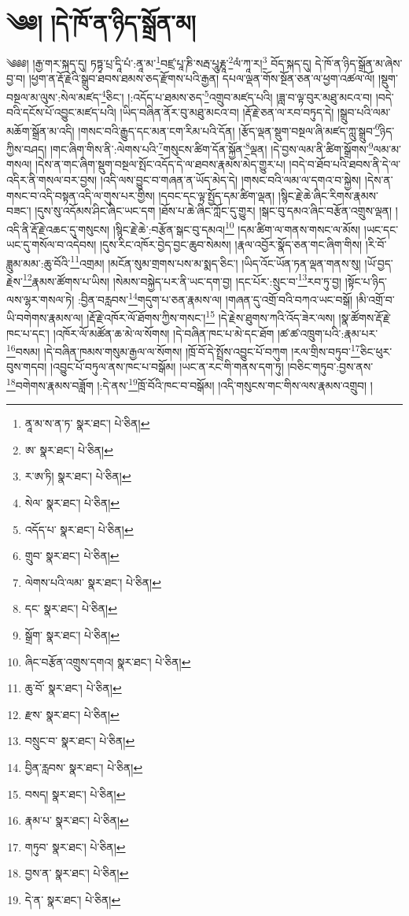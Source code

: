 \setcounter{footnote}{0} 
\chapter{༄༅། །དེ་ཁོ་ན་ཉིད་སྒྲོན་མ།}༄༅༅། །རྒྱ་གར་སྐད་དུ། ཏཏྟྭ་པྲ་དཱི་པཾ་:ནཱ་མ་\footnote{ནཱ་མ་ས་ན་ཏ་  སྣར་ཐང་།  པེ་ཅིན། }བཛྲ་པཱ་ཎི་སརྦ་པཱུརྞཱ་\footnote{ཨ་  སྣར་ཐང་།  པེ་ཅིན། }ལཾ་ཀཱ་ར།\footnote{ར་ཨ་ཏི།  སྣར་ཐང་།  པེ་ཅིན། } བོད་སྐད་དུ། དེ་ཁོ་ན་ཉིད་སྒྲོན་མ་ཞེས་བྱ་བ། །ཕྱག་ན་རྡོ་རྗེའི་སྒྲུབ་ཐབས་ཐམས་ཅད་རྫོགས་པའི་རྒྱན། དཔལ་ལྡན་གོས་སྔོན་ཅན་ལ་ཕྱག་འཚལ་ལོ། །སྡུག་བསྔལ་མ་ལུས་:སེལ་མཛད་\footnote{སེལ་  སྣར་ཐང་།  པེ་ཅིན། }ཅིང་། །:འདོད་པ་ཐམས་ཅད་\footnote{འདོད་པ་  སྣར་ཐང་།  པེ་ཅིན། }འགྲུབ་མཛད་པའི། །ཟླ་བ་ལྟ་བུར་མཐུ་མངའ་བ། །བདེ་བའི་དངོས་པོ་འབྱུང་མཛད་པའི། །ཡིད་བཞིན་ནོར་བུ་མཐུ་མངའ་བ། །རྡོ་རྗེ་ཅན་ལ་རབ་བཏུད་དེ། །སྒྲུབ་པའི་ལམ་མཆོག་སྒྲོན་མ་འདི། །གསང་བའི་རྒྱུད་དང་མན་ངག་རིམ་པའི་དོན། །རྩོད་ལྡན་སྡུག་བསྔལ་ཞི་མཛད་ཀླུ་སྒྲུབ་\footnote{གྲུབ་  སྣར་ཐང་།  པེ་ཅིན། }ཉིད་ཀྱིས་བཤད། །གང་ཞིག་གིས་ནི་:ལེགས་པའི་\footnote{ལེགས་པའི་ལམ་  སྣར་ཐང་།  པེ་ཅིན། }གསུངས་ཚིག་དོན་སྐྱོན་\footnote{དང་  སྣར་ཐང་།  པེ་ཅིན། }ལྡན། །དེ་བྱས་ལམ་ནི་ཚིག་སྒྲོགས་\footnote{སྒྲོག་  སྣར་ཐང་།  པེ་ཅིན། }ལམ་མ་གསལ། །དེས་ན་གང་ཞིག་སྡུག་བསྔལ་སྤོང་འདོད་དེ་ལ་ཐབས་རྣམས་མེད་གྱུར་པ། །བདེ་བ་ཐོབ་པའི་ཐབས་ནི་དེ་ལ་འདིར་ནི་གསལ་བར་བྱས། །འདི་ལས་བྱུང་བ་གཞན་ན་ཡོད་མེད་དེ། །གསང་བའི་ལམ་ལ་དགའ་བ་སྐྱེས། །དེས་ན་གསང་བ་འདི་བསྟན་འདི་ལ་གུས་པར་གྱིས། །དབང་དང་ལྟ་སྤྱོད་དམ་ཚིག་ལྡན། །སྙིང་རྗེ་ཆེ་ཞིང་རིགས་རྣམས་བཟང་། །དུས་སུ་འདོམས་ཤིང་ཞིང་ཡང་དག །ཐོས་པ་ཆེ་ཞིང་ཀློང་དུ་གྱུར། །སྒང་བུ་དམའ་ཞིང་བརྩོན་འགྲུས་ལྡན། །འདི་ནི་རྡོ་རྗེ་འཆང་དུ་གསུངས། །སྙིང་རྗེ་ཆེ་:བརྩོན་སྒང་བུ་དམའ།\footnote{ཞིང་བརྩོན་འགྲུས་དགའ།  སྣར་ཐང་།  པེ་ཅིན། } །དམ་ཚིག་ལ་གནས་གསང་ལ་མོས། །ཡང་དང་ཡང་དུ་གསོལ་བ་འདེབས། །དུས་རིང་འཁོར་བྱེད་བྱང་ཆུབ་སེམས། །རྣལ་འབྱོར་སྣོད་ཅན་གང་ཞིག་གིས། །རི་བོ་ཟླུམ་མམ་:ཆུ་བོའི་\footnote{ཆུ་བོ་  སྣར་ཐང་།  པེ་ཅིན། }འགྲམ། །མངོན་སུམ་གྲགས་པས་མ་སྨད་ཅིང་། །ཡིད་འོང་ཡོན་ཏན་ལྡན་གནས་སུ། །ཡོ་བྱད་རྗེས་\footnote{རྫས་  སྣར་ཐང་།  པེ་ཅིན། }རྣམས་ཚོགས་པ་ཡིས། །སེམས་བསྐྱེད་པར་ནི་ཡང་དག་བྱ། །དང་པོར་:སྲུང་བ་\footnote{བསྲུང་བ་  སྣར་ཐང་།  པེ་ཅིན། }རབ་ཏུ་བྱ། །སྟོང་པ་ཉིད་ལས་ལྷར་གསལ་ཏེ། :བྱིན་བརླབས་\footnote{བྱིན་རླབས་  སྣར་ཐང་།  པེ་ཅིན། }གདུག་པ་ཅན་རྣམས་ལ། །གཞན་དུ་འགྲོ་བའི་བཀའ་ཡང་བསྒོ། །མི་འགྲོ་བ་ཡི་བགེགས་རྣམས་ལ། །རྡོ་རྗེ་འཁོར་ལོ་ཐོགས་ཀྱིས་གསང་།\footnote{བསད།  སྣར་ཐང་།  པེ་ཅིན། } །དེ་རྗེས་ཐུགས་ཀའི་འོད་ཟེར་ལས། །སྣ་ཚོགས་རྡོ་རྗེ་ཁང་པ་དང་། །འཁོར་ལོ་མཚོན་ཆ་མེ་ལ་སོགས། །དེ་བཞིན་ཁང་པ་མེ་དང་ཐོག །ཚ་ཚ་འཁྲུག་པའི་:རྣམ་པར་\footnote{རྣམ་པ་  སྣར་ཐང་།  པེ་ཅིན། }བསམ། །དེ་བཞིན་ཁམས་གསུམ་རྒྱལ་ལ་སོགས། །ཁྲོ་བོ་དེ་སྤྲོས་འབྱུང་པོ་བཀུག །རལ་གྲིས་བཏུབ་\footnote{གཏུབ་  སྣར་ཐང་།  པེ་ཅིན། }ཅིང་ཕུར་བུས་གདབ། །འབྱུང་པོ་བཏུལ་ནས་ཁང་པ་བསྒོམ། །ཡང་ན་རང་གི་གནས་དག་ཏུ། །བཅིང་གཏུབ་:བྱས་ནས་\footnote{བྱས་ན་  སྣར་ཐང་།  པེ་ཅིན། }བགེགས་རྣམས་བཟློག །:དེ་ནས་\footnote{དེ་ན་  སྣར་ཐང་།  པེ་ཅིན། }ཁྲོ་བོའི་ཁང་བ་བསྒོམ། །འདི་གསུངས་གང་གིས་ལས་རྣམས་འགྲུབ། །

